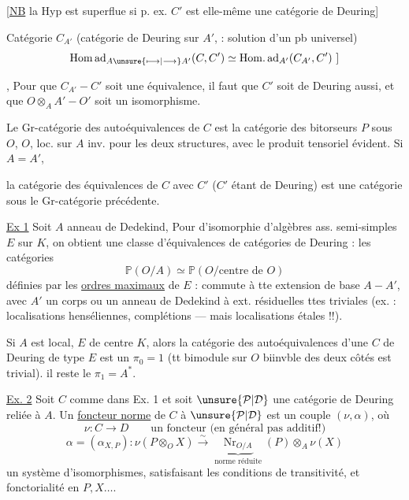 [\uline{NB} la Hyp est superflue si p. ex. $C'$ est elle-même une catégorie de Deuring]

Catégorie $C_{A'}$ (catégorie de Deuring sur $A'$,  : solution d'un pb universel)
\[
\operatorname{Hom\,ad}_{A\unsure{\longmapsto|\longrightarrow}A'}(C,C')\simeq\operatorname{Hom.ad}_{A'}(C_{A'},C')\ ]
\]

, Pour que $C_{A'}\mathbin{-}C'$ soit une équivalence, il faut que $C'$ soit de Deuring aussi, et que $O\otimes_A A'\mathbin{-}O'$ soit un isomorphisme.

Le Gr-catégorie des autoéquivalences de $C$ est \inserted{$\simeq$} la catégorie des bitorseurs $P$ sous $O$, $O$, loc. sur $A$ inv. pour les deux structures, avec le produit tensoriel évident. Si $A=A'$,



la catégorie des équivalences de $C$ avec $C'$ ($C'$ étant de Deuring) est une catégorie sous le Gr-catégorie précédente.

\uline{Ex 1} Soit $A$ anneau de Dedekind,  Pour    d'isomorphie d'algèbres  ass. semi-simples $E$ sur $K$, on obtient une classe d'équivalences de catégories de Deuring : les catégories
\[
\mathbb P(O/A)\simeq\mathbb P(O/\text{centre de }O)
\]
définies par les \uline{ordres maximaux} de $E$ :   commute à tte extension de base $A\mathbin{-}A'$, avec $A'$ un corps ou un anneau de Dedekind à ext. résiduelles ttes triviales (ex. : localisations henséliennes, complétions --- mais  localisations étales !!).


Si $A$ est local, $E$  de centre $K$, alors la catégorie  des autoéquivalences d'une $C$ de Deuring de type $E$ est un $\pi_0=1$ (tt bimodule sur $O$ biinvble des deux côtés est trivial).   il reste le $\pi_1=A^*$.


\uline{Ex. 2} Soit $C$ comme dans Ex. 1 et soit $\unsure{\mathcal P|\mathcal D}$ une catégorie de Deuring reliée à $A$. Un \uline{foncteur norme} de $C$ à $\unsure{\mathcal P|\mathcal D}$ est un couple $(\nu,\alpha)$, où
\[
\nu:C\longrightarrow D\qquad\text{un foncteur (en général pas additif!)}
\]
\[
\alpha=(\alpha_{X,P}):\nu(P\otimes_O X)\xrightarrow{\sim}
\underbrace{\operatorname{Nr}_{O/A}}_{\text{norme réduite}}(P)\otimes_A\nu(X)
\]
un système d'isomorphismes, satisfaisant les conditions de transitivité, et fonctorialité en $P,X\ldots$.

